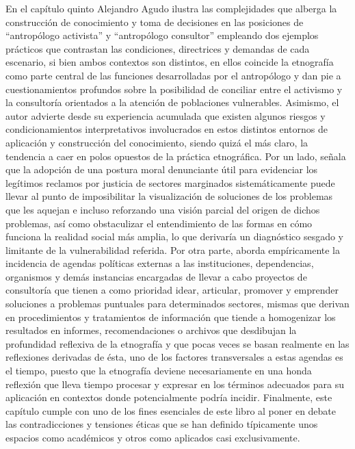 \documentclass[
  spanish,
  11.5pt,
  170mm x 240mmpaper,
]{scrbook}
\begin{document}
En el capítulo quinto Alejandro Agudo ilustra las complejidades que
alberga la construcción de conocimiento y toma de decisiones en las
posiciones de ``antropólogo activista'' y ``antropólogo consultor''
empleando dos ejemplos prácticos que contrastan las condiciones,
directrices y demandas de cada escenario, si bien ambos contextos son
distintos, en ellos coincide la etnografía como parte central de las
funciones desarrolladas por el antropólogo y dan pie a cuestionamientos
profundos sobre la posibilidad de conciliar entre el activismo y la
consultoría orientados a la atención de poblaciones vulnerables.
Asimismo, el autor advierte desde su experiencia acumulada que existen
algunos riesgos y condicionamientos interpretativos involucrados en
estos distintos entornos de aplicación y construcción del conocimiento,
siendo quizá el más claro, la tendencia a caer en polos opuestos de la
práctica etnográfica. Por un lado, señala que la adopción de una postura
moral denunciante útil para evidenciar los legítimos reclamos por
justicia de sectores marginados sistemáticamente puede llevar al punto
de imposibilitar la visualización de soluciones de los problemas que les
aquejan e incluso reforzando una visión parcial del origen de dichos
problemas, así como obstaculizar el entendimiento de las formas en cómo
funciona la realidad social más amplia, lo que derivaría un diagnóstico
sesgado y limitante de la vulnerabilidad referida. Por otra parte,
aborda empíricamente la incidencia de agendas políticas externas a las
instituciones, dependencias, organismos y demás instancias encargadas de
llevar a cabo proyectos de consultoría que tienen a como prioridad
idear, articular, promover y emprender soluciones a problemas puntuales
para determinados sectores, mismas que derivan en procedimientos y
tratamientos de información que tiende a homogenizar los resultados en
informes, recomendaciones o archivos que desdibujan la profundidad
reflexiva de la etnografía y que pocas veces se basan realmente en las
reflexiones derivadas de ésta, uno de los factores transversales a estas
agendas es el tiempo, puesto que la etnografía deviene necesariamente en
una honda reflexión que lleva tiempo procesar y expresar en los términos
adecuados para su aplicación en contextos donde potencialmente podría
incidir. Finalmente, este capítulo cumple con uno de los fines
esenciales de este libro al poner en debate las contradicciones y
tensiones éticas que se han definido típicamente unos espacios como
académicos y otros como aplicados casi exclusivamente.
\end{document}

